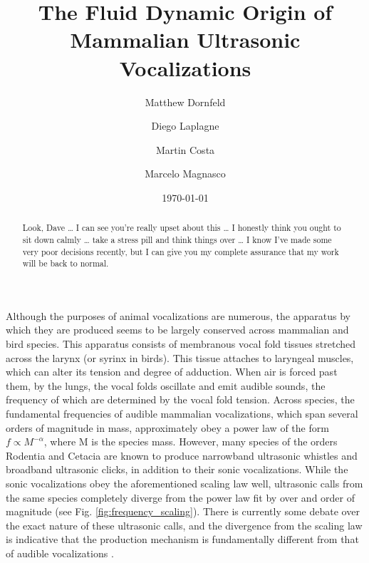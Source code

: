 \documentclass[twocolumn, prl]{revtex4}
\begin{document}
\title{The Fluid Dynamic Origin of Mammalian Ultrasonic Vocalizations}

\author{Matthew Dornfeld}

\author{Diego Laplagne}

\author{Martin Costa} 

\author{Marcelo Magnasco}
\date{\today}
\begin{abstract}
Look, Dave … I can see you’re really upset about this … I honestly think you ought to sit down calmly … take a stress pill and think things over … I know I’ve made some very poor decisions recently, but I can give you my complete assurance that my work will be back to normal.
\end{abstract}
\maketitle
Although the purposes of animal vocalizations are numerous, the apparatus by which they are produced seems to be largely conserved across mammalian and bird species. This apparatus consists of membranous vocal fold tissues stretched across the larynx (or syrinx in birds). This tissue attaches to laryngeal muscles, which can alter its tension and degree of adduction. When air is forced past them, by the lungs, the vocal folds oscillate and emit audible sounds, the frequency of which are determined by the vocal fold tension. Across species, the fundamental frequencies of audible mammalian vocalizations, which span several orders of magnitude in mass, approximately obey a power law of the form $f\propto M^{-\alpha}$, where M is the species mass. However, many species of the orders Rodentia and Cetacia are known to produce narrowband ultrasonic whistles and broadband ultrasonic clicks, in addition to their sonic vocalizations. While the sonic vocalizations obey the aforementioned scaling law well, ultrasonic calls from the same species completely diverge from the power law fit by over and order of magnitude (see Fig. \ref{fig:frequency_scaling}). There is currently some debate over the exact nature of these ultrasonic calls, and the divergence from the scaling law is indicative that the production mechanism is fundamentally different from that of audible vocalizations \cite{Fletcher2010, Berke2010}.
\end{document}
